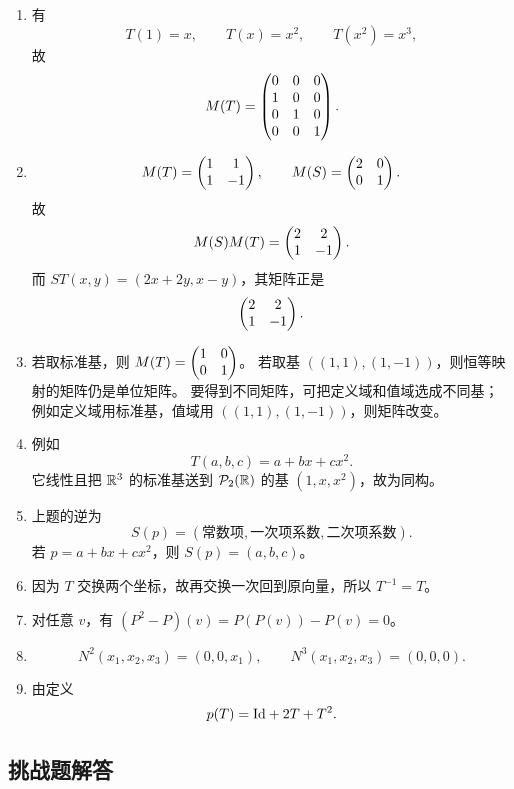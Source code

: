 \begin{enumerate}[label=\medium\ \arabic*., leftmargin=*]
$\poly_2(\R)$，所以该规则并没有把空间映到自身，因而不是从 $\poly_2(\R)$ 到 $\poly_2(\R)$ 的映射。 \item 有 \[
T(1)=x,\qquad T(x)=x^2,\qquad T(x^2)=x^3, \] 故 \[ M(T)=\begin{pmatrix} 0 & 0 & 0\\ 1 & 0 & 0\\ 0 &
1 & 0\\ 0 & 0 & 1 \end{pmatrix}. \] \item \[ M(T)=\begin{pmatrix} 1 & 1\\ 1 & -1 \end{pmatrix},\qquad M(S)=\begin{pmatrix} 2 & 0\\ 0 &
1 \end{pmatrix}. \] 故 \[ M(S)M(T)=\begin{pmatrix} 2 & 2\\ 1 & -1 \end{pmatrix}. \] 而 $ST(x,y)=(2x+2y,x-y)$，其矩阵正是 \[ \begin{pmatrix} 2 &
2\\ 1 & -1 \end{pmatrix}. \] \item 若取标准基，则 $M(T)=\begin{pmatrix} 1 & 0\\ 0 & 1 \end{pmatrix}$。 若取基
$((1,1),(1,-1))$，则恒等映射的矩阵仍是单位矩阵。 要得到不同矩阵，可把定义域和值域选成不同基；例如定义域用标准基，值域用
$((1,1),(1,-1))$，则矩阵改变。 \item 例如 \[ T(a,b,c)=a+bx+cx^2. \] 它线性且把 $\mathbb{R}^3$ 的标准基送到
$\poly_2(\R)$ 的基 $(1,x,x^2)$，故为同构。 \item 上题的逆为 \[
S(p)=(\text{常数项},\text{一次项系数},\text{二次项系数}). \] 若 $p=a+bx+cx^2$，则 $S(p)=(a,b,c)$。 \item
因为 $T$ 交换两个坐标，故再交换一次回到原向量，所以 $T^{-1}=T$。 \item 对任意 $v$，有 $(P^2-P)(v)=P(P(v))-P(v)=0$。
\item \[ N^2(x_1,x_2,x_3)=(0,0,x_1),\qquad N^3(x_1,x_2,x_3)=(0,0,0). \] \item 由定义 \[
p(T)=\mathrm{Id}+2T+T^2. \] \end{enumerate}

\subsection*{挑战题解答}

